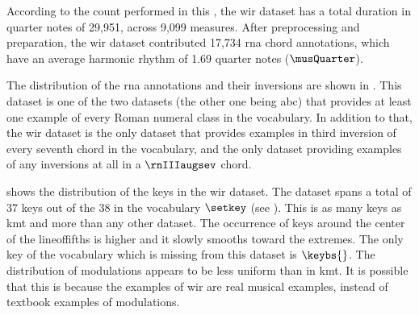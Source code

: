 
According to the count performed in this \thesisdiss{}, the
\gls{wir} dataset has a total duration in quarter notes of
29,951, across 9,099 measures. After preprocessing and
preparation, the \gls{wir} dataset contributed 17,734
\gls{rna} chord annotations, which have an average harmonic
rhythm of 1.69 quarter notes ($\musQuarter$).

The distribution of the \gls{rna} annotations and their
inversions are shown in . This
dataset is one of the two datasets (the other one being
\gls{abc}) that provides at least one example of every Roman
numeral class in the vocabulary. In addition to that, the
\gls{wir} dataset is the only dataset that provides examples
in third inversion of every seventh chord in the vocabulary,
and the only dataset providing examples of any inversions at
all in a $\rnIIIaugsev$ chord.



 shows the distribution of the keys
in the \gls{wir} dataset. The dataset spans a total of 37
keys out of the 38 in the vocabulary $\setkey$ (see
). This is as many keys
as \gls{kmt} and more than any other dataset. The occurrence
of keys around the center of the \gls{lineoffifths} is
higher and it slowly smooths toward the extremes. The only
key of the vocabulary which is missing from this dataset is
$\keybs{}$. The distribution of modulations appears to be
less uniform than in \gls{kmt}. It is possible that this is
because the examples of \gls{wir} are real musical examples,
instead of textbook examples of modulations.
